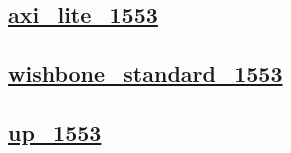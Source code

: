 \documentclass{article}
\begin{document}
  


  \subsection{\href{../files/axi_lite_1553-v.html}{axi\_lite\_1553}}

  \subsection{\href{../files/wishbone_standard_1553-v.html}{wishbone\_standard\_1553}}

  \subsection{\href{../files/up_1553-v.html}{up\_1553}}
\end{document}
